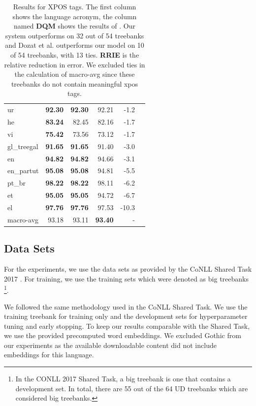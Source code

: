 \documentclass[11pt,a4paper]{article}
\begin{document}
\begin{table}[]
\begin{center}
\begin{tabular}{|l|r||r|r|r|r|}
ur          & \bf  92.30  & \bf 92.30  &     92.21  &     -1.2\\
he          & \bf  83.24  &     82.45  &     82.16  &     -1.7\\
vi          & \bf  75.42  &     73.56  &     73.12  &     -1.7\\
gl\_treegal & \bf  91.65  & \bf 91.65  &     91.40  &     -3.0\\
en          & \bf  94.82  & \bf 94.82  &     94.66  &     -3.1\\
en\_partut  & \bf  95.08  & \bf 95.08  &     94.81  &     -5.5\\
pt\_br      & \bf  98.22  & \bf 98.22  &     98.11  &     -6.2\\
et          & \bf  95.05  & \bf 95.05  &     94.72  &     -6.7\\
el          & \bf  97.76  & \bf 97.76  &     97.53  &    -10.3\\\hline
macro-avg   &      93.18  &     93.11  & \bf 93.40  &      -  \\\hline
\end{tabular}
\end{center}
    \caption{\label{table:state-of-the-art-xpos} Results for XPOS tags. The first column shows the language acronym, the column named \textbf{DQM} shows the results of . Our system outperforms  on 32 out of 54 treebanks and Dozat et al. outperforms our model on 10 of 54 treebanks, with 13 ties. \textbf{RRIE} is the relative reduction in error. We excluded ties in the calculation of macro-avg since these treebanks do not contain meaningful xpos tags.} 
\end{table}


\subsection{Data Sets}

For the experiments, we use the data sets as provided by the CoNLL Shared Task 2017 \cite{zeman-EtAl:2017:K17-3}. For training, we use the training sets which were denoted as big treebanks \footnote{In the CONLL 2017 Shared Task, a big treebank is one that contains a development set. In total, there are 55 out of the 64 UD treebanks which are considered big treebanks.}.


We followed the same methodology used in the CoNLL Shared Task. We use the training treebank for training only and the development sets for hyperparameter tuning and early stopping. To keep our results comparable with the Shared Task, we use the provided precomputed word embeddings. We excluded Gothic from our experiments as the available downloadable content did not include embeddings for this language.
\end{document}
